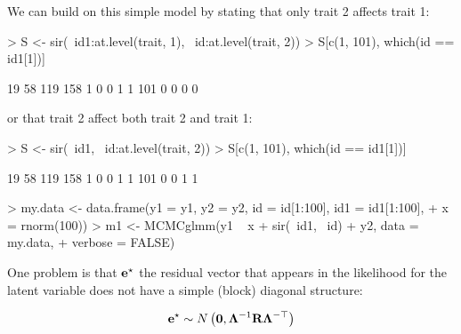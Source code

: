 \documentclass{article}
\begin{document}
We can build on this simple model by stating that only trait 2 affects trait 1:

\begin{Schunk}
\begin{Sinput}
> S <- sir(~id1:at.level(trait, 1), ~id:at.level(trait, 2))
> S[c(1, 101), which(id == id1[1])]
\end{Sinput}
\begin{Soutput}
    19 58 119 158
1    0  0   1   1
101  0  0   0   0
\end{Soutput}
\end{Schunk}

or that trait 2 affect both trait 2 and trait 1:

\begin{Schunk}
\begin{Sinput}
> S <- sir(~id1, ~id:at.level(trait, 2))
> S[c(1, 101), which(id == id1[1])]
\end{Sinput}
\begin{Soutput}
    19 58 119 158
1    0  0   1   1
101  0  0   1   1
\end{Soutput}
\end{Schunk}


\begin{Schunk}
\begin{Sinput}
> my.data <- data.frame(y1 = y1, y2 = y2, id = id[1:100], id1 = id1[1:100], 
+     x = rnorm(100))
> m1 <- MCMCglmm(y1 ~ x + sir(~id1, ~id) + y2, data = my.data, 
+     verbose = FALSE)
\end{Sinput}
\end{Schunk}

One problem is that ${\bf e}^{\star}$ the residual vector that appears in the likelihood for the latent variable does not have a simple (block) diagonal structure:

\begin{equation}
{\bf e}^{\star} \sim N\left({\bm 0}, {\bm \Lambda}^{-1}{\bf R}{\bm \Lambda}^{-\top}\right)
\end{equation}





\ifalone
\end{document}
